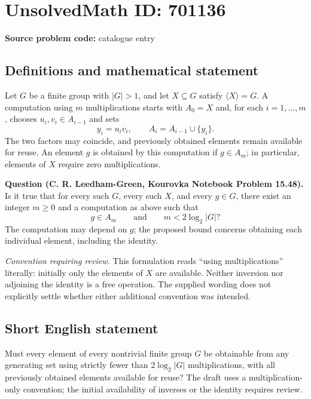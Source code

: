\documentclass[11pt]{article}
\begin{document}
\section*{UnsolvedMath ID: 701136}
\textbf{Source problem code:} catalogue entry
\subsection{Definitions and mathematical statement}
Let \(G\) be a finite group with \(|G|>1\), and let \(X\subseteq G\) satisfy \(\langle X\rangle=G\). A computation using \(m\) multiplications starts with \(A_0=X\) and, for each \(i=1,\ldots,m\), chooses \(u_i,v_i\in A_{i-1}\) and sets
\[
y_i=u_iv_i,\qquad A_i=A_{i-1}\cup\{y_i\}.
\]
The two factors may coincide, and previously obtained elements remain available for reuse. An element \(g\) is obtained by this computation if \(g\in A_m\); in particular, elements of \(X\) require zero multiplications.

\textbf{Question (C. R. Leedham-Green, Kourovka Notebook Problem 15.48).} Is it true that for every such \(G\), every such \(X\), and every \(g\in G\), there exist an integer \(m\geq 0\) and a computation as above such that
\[
g\in A_m\qquad\text{and}\qquad m<2\log_2|G|?
\]
The computation may depend on \(g\); the proposed bound concerns obtaining each individual element, including the identity.

\textit{Convention requiring review.} This formulation reads ``using multiplications'' literally: initially only the elements of \(X\) are available. Neither inversion nor adjoining the identity is a free operation. The supplied wording does not explicitly settle whether either additional convention was intended.
\subsection{Short English statement}
Must every element of every nontrivial finite group \(G\) be obtainable from any generating set using strictly fewer than \(2\log_2|G|\) multiplications, with all previously obtained elements available for reuse? The draft uses a multiplication-only convention; the initial availability of inverses or the identity requires review.
\end{document}
